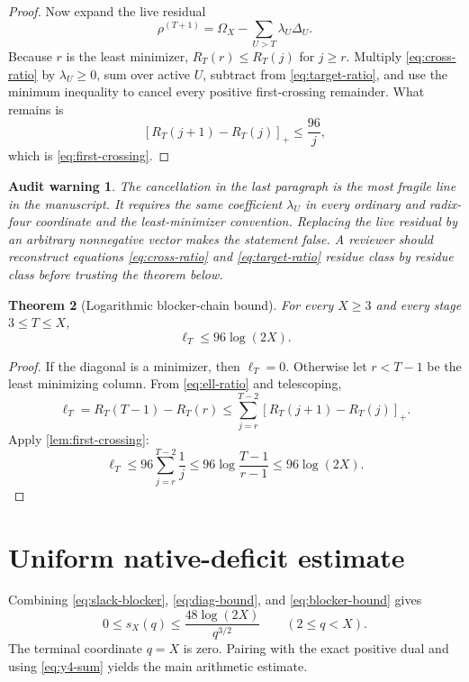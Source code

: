 \documentclass[11pt]{article}
\newtheorem{theorem}{Theorem}[section]
\newtheorem{warning}[theorem]{Audit warning}
\newcommand{\Om}{\Omega}
\begin{document}
\begin{proof}
Now expand the live residual
\[
 \rho^{(T+1)}=\Om_X-\sum_{U>T}\lambda_U\Delta_U.
\]
Because $r$ is the least minimizer, $R_T(r)\le R_T(j)$ for $j\ge r$. Multiply \eqref{eq:cross-ratio} by $\lambda_U\ge0$, sum over active $U$, subtract from \eqref{eq:target-ratio}, and use the minimum inequality to cancel every positive first-crossing remainder. What remains is
\[
 [R_T(j+1)-R_T(j)]_+\le\frac{96}{j},
\]
which is \eqref{eq:first-crossing}.
\end{proof}

\begin{warning}
The cancellation in the last paragraph is the most fragile line in the manuscript. It requires the same coefficient $\lambda_U$ in every ordinary and radix-four coordinate and the least-minimizer convention. Replacing the live residual by an arbitrary nonnegative vector makes the statement false. A reviewer should reconstruct equations \eqref{eq:cross-ratio} and \eqref{eq:target-ratio} residue class by residue class before trusting the theorem below.
\end{warning}

\begin{theorem}[Logarithmic blocker-chain bound]\label{thm:blocker}
For every $X\ge3$ and every stage $3\le T\le X$,
\begin{equation}
 \boxed{\ell_T\le96\log(2X).}
 \label{eq:blocker-bound}
\end{equation}
\end{theorem}

\begin{proof}
If the diagonal is a minimizer, then $\ell_T=0$. Otherwise let $r<T-1$ be the least minimizing column. From \eqref{eq:ell-ratio} and telescoping,
\[
 \ell_T=R_T(T-1)-R_T(r)
 \le\sum_{j=r}^{T-2}[R_T(j+1)-R_T(j)]_+.
\]
Apply \cref{lem:first-crossing}:
\[
 \ell_T\le96\sum_{j=r}^{T-2}\frac1j
 \le96\log\frac{T-1}{r-1}
 \le96\log(2X).
\]
\end{proof}

\section{Uniform native-deficit estimate}

Combining \eqref{eq:slack-blocker}, \eqref{eq:diag-bound}, and \eqref{eq:blocker-bound} gives
\begin{equation}
 0\le s_X(q)
 \le\frac{48\log(2X)}{q^{3/2}}
 \qquad(2\le q<X).
 \label{eq:pointwise-slack}
\end{equation}
The terminal coordinate $q=X$ is zero. Pairing with the exact positive dual and using \eqref{eq:y4-sum} yields the main arithmetic estimate.
\end{document}
